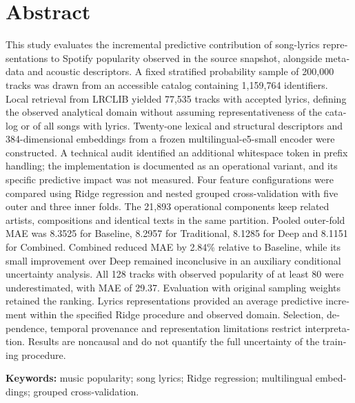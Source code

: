 \chapter*{Abstract}
\begin{otherlanguage}{english}
This study evaluates the incremental predictive contribution of song-lyrics representations to Spotify popularity observed in the source snapshot, alongside metadata and acoustic descriptors. A fixed stratified probability sample of 200,000 tracks was drawn from an accessible catalog containing 1,159,764 identifiers. Local retrieval from LRCLIB yielded 77,535 tracks with accepted lyrics, defining the observed analytical domain without assuming representativeness of the catalog or of all songs with lyrics. Twenty-one lexical and structural descriptors and 384-dimensional embeddings from a frozen multilingual-e5-small encoder were constructed. A technical audit identified an additional whitespace token in prefix handling; the implementation is documented as an operational variant, and its specific predictive impact was not measured. Four feature configurations were compared using Ridge regression and nested grouped cross-validation with five outer and three inner folds. The 21,893 operational components keep related artists, compositions and identical texts in the same partition. Pooled outer-fold MAE was 8.3525 for Baseline, 8.2957 for Traditional, 8.1285 for Deep and 8.1151 for Combined. Combined reduced MAE by 2.84\% relative to Baseline, while its small improvement over Deep remained inconclusive in an auxiliary conditional uncertainty analysis. All 128 tracks with observed popularity of at least 80 were underestimated, with MAE of 29.37. Evaluation with original sampling weights retained the ranking. Lyrics representations provided an average predictive increment within the specified Ridge procedure and observed domain. Selection, dependence, temporal provenance and representation limitations restrict interpretation. Results are noncausal and do not quantify the full uncertainty of the training procedure.

\noindent\textbf{Keywords:} music popularity; song lyrics; Ridge regression; multilingual embeddings; grouped cross-validation.
\end{otherlanguage}

